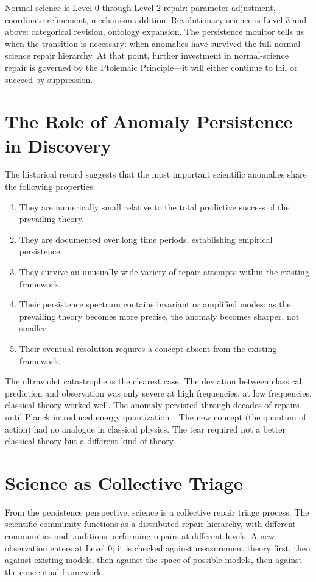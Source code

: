 \documentclass[12pt,oneside]{book}
\theoremstyle{plain}
\theoremstyle{definition}
\theoremstyle{remark}
\newcommand{\1}{\mathbf{1}}
\begin{document}
Normal science is Level-0 through Level-2 repair: parameter adjustment, coordinate refinement, mechanism addition. Revolutionary science is Level-3 and above: categorical revision, ontology expansion. The persistence monitor tells us when the transition is necessary: when anomalies have survived the full normal-science repair hierarchy. At that point, further investment in normal-science repair is governed by the Ptolemaic Principle---it will either continue to fail or succeed by suppression.

\section{The Role of Anomaly Persistence in Discovery}

The historical record suggests that the most important scientific anomalies share the following properties:

\begin{enumerate}[label=(\roman*)]
\item They are numerically small relative to the total predictive success of the prevailing theory.
\item They are documented over long time periods, establishing empirical persistence.
\item They survive an unusually wide variety of repair attempts within the existing framework.
\item Their persistence spectrum contains invariant or amplified modes: as the prevailing theory becomes more precise, the anomaly becomes sharper, not smaller.
\item Their eventual resolution requires a concept absent from the existing framework.
\end{enumerate}

The ultraviolet catastrophe is the clearest case. The deviation between classical prediction and observation was only severe at high frequencies; at low frequencies, classical theory worked well. The anomaly persisted through decades of repairs until Planck introduced energy quantization~\cite{planck1901}. The new concept (the quantum of action) had no analogue in classical physics. The tear required not a better classical theory but a different kind of theory.

\section{Science as Collective Triage}

From the persistence perspective, science is a collective repair triage process. The scientific community functions as a distributed repair hierarchy, with different communities and traditions performing repairs at different levels. A new observation enters at Level 0; it is checked against measurement theory first, then against existing models, then against the space of possible models, then against the conceptual framework.
\end{document}

